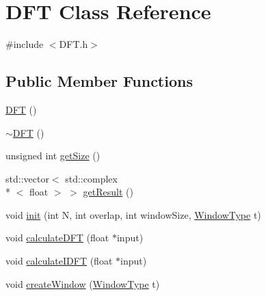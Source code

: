 \hypertarget{class_d_f_t}{\section{D\+F\+T Class Reference}
\label{class_d_f_t}
}


{\ttfamily \#include $<$D\+F\+T.\+h$>$}

\subsection*{Public Member Functions}
\begin{DoxyCompactItemize}
\item 
\hyperlink{class_d_f_t_a0c6490b91246e9c94e4982d775cad57c}{D\+F\+T} ()
\item 
\hyperlink{class_d_f_t_a6ffdbff309d9fe1745b53057b17656a7}{$\sim$\+D\+F\+T} ()
\item 
unsigned int \hyperlink{class_d_f_t_aedcb31a5850bd234b364f9e5a4b6054f}{get\+Size} ()
\item 
std\+::vector$<$ std\+::complex\\*
$<$ float $>$ $>$ \hyperlink{class_d_f_t_a6a230c0976ee6e3107e5a887d5635996}{get\+Result} ()
\item 
void \hyperlink{class_d_f_t_a77f1255df4c6d081b128c0f564711c46}{init} (int N, int overlap, int window\+Size, \hyperlink{_utility_8h_a476342970f954b62d70552bcbb5ee509}{Window\+Type} t)
\item 
void \hyperlink{class_d_f_t_a221c4f7a7c461114902742bdb233c9eb}{calculate\+D\+F\+T} (float $\ast$input)
\item 
void \hyperlink{class_d_f_t_a961c44e0f89faaaca94bd1bec3a7d98e}{calculate\+I\+D\+F\+T} (float $\ast$input)
\item 
void \hyperlink{class_d_f_t_a99ddac59f175fdc4e807c5c8d57251e3}{create\+Window} (\hyperlink{_utility_8h_a476342970f954b62d70552bcbb5ee509}{Window\+Type} t)
\end{DoxyCompactItemize}


